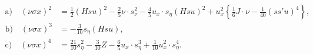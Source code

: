 
\[
\tag{7.}
\begin{aligned}
\text{a)}\quad (\nu\sigma x)^2
&=\frac12(Hsu)^2-\frac25\nu\cdot s_\nu^2-\frac45u_x\cdot s_\eta(Hsu)^2+u_x^2\left\{\frac16J\cdot\nu-\frac1{40}(ss'u)^4\right\},\\
\text{b)}\quad (\nu\sigma x)^3&=-\frac3{10}s_\eta(Hsu),\\
\text{c)}\quad (\nu\sigma x)^4&=\frac{21}{10}s_\eta^2-\frac3{10}Z-\frac65u_x\cdot s_\eta^3+\frac1{10}u_x^2\cdot s_\eta^4.
\end{aligned}
\]
